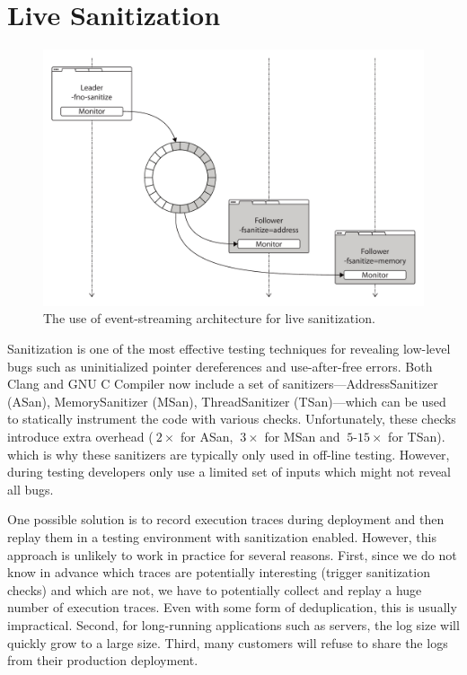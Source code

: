 \section{Live Sanitization}
\label{sec:sanitization}

\begin{figure}[t]
  \begin{center}
    \includegraphics[width=0.75\columnwidth]{applications/figures/live-sanitization}
    \caption{The use of event-streaming architecture for live sanitization.}
    \label{fig:live-sanitization}
  \end{center}
\end{figure}

Sanitization is one of the most effective testing techniques for
revealing low-level bugs such as uninitialized pointer dereferences and
use-after-free errors.  Both Clang and GNU C Compiler now include a set
of sanitizers---AddressSanitizer (ASan), MemorySanitizer (MSan),
ThreadSanitizer (TSan)---which can be used to statically instrument
the code with various checks.  Unfortunately, these checks introduce
extra overhead (\eg $~2\times$ for ASan, $~3\times$ for MSan and
$~5$-$15\times$ for TSan).  which is why these sanitizers are typically
only used in off-line testing. However, during testing developers only
use a limited set of inputs which might not reveal all bugs.

One possible solution is to record execution traces during deployment
and then replay them in a testing environment with sanitization
enabled. However, this approach is unlikely to work in practice for
several reasons. First, since we do not know in advance which traces
are potentially interesting (\eg trigger sanitization checks) and
which are not, we have to potentially collect and replay a huge number
of execution traces. Even with some form of deduplication, this is
usually impractical. Second, for long-running applications such as
servers, the log size will quickly grow to a large size. Third, many
customers will refuse to share the logs from their production
deployment.

